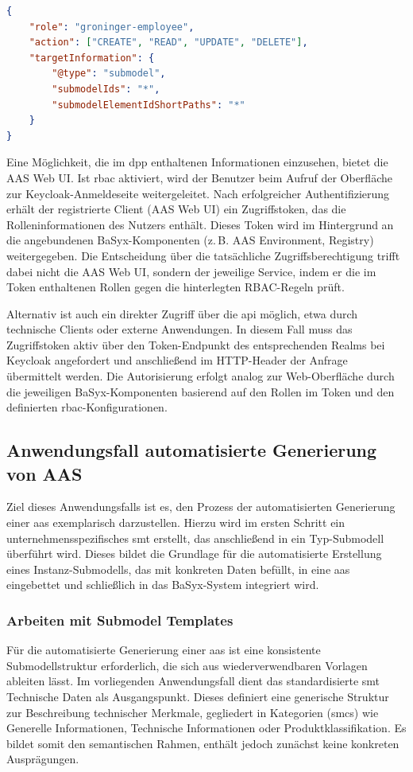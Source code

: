 \begin{lstlisting}[language=json, caption={RBAC-Konfiguration für die Rolle Groninger-Mitarbeiter}, label={lst:groningerMitarbeiterRBAC}]
{
    "role": "groninger-employee",
    "action": ["CREATE", "READ", "UPDATE", "DELETE"],
    "targetInformation": {
        "@type": "submodel",
        "submodelIds": "*",
        "submodelElementIdShortPaths": "*"
    }
}
\end{lstlisting}

Eine Möglichkeit, die im \acs{dpp} enthaltenen Informationen einzusehen, bietet die AAS Web UI. 
Ist \acs{rbac} aktiviert, wird der Benutzer beim Aufruf der Oberfläche zur Keycloak-Anmeldeseite weitergeleitet.  
Nach erfolgreicher Authentifizierung erhält der registrierte Client (AAS Web UI) ein Zugriffstoken, das die Rolleninformationen des Nutzers enthält.  
Dieses Token wird im Hintergrund an die angebundenen BaSyx-Komponenten (z.\,B. AAS Environment, Registry) weitergegeben.  
Die Entscheidung über die tatsächliche Zugriffsberechtigung trifft dabei nicht die AAS Web UI, sondern der jeweilige Service, indem er die im Token enthaltenen Rollen gegen die hinterlegten RBAC-Regeln prüft.

Alternativ ist auch ein direkter Zugriff über die \acs{api} möglich, etwa durch technische Clients oder externe Anwendungen.  
In diesem Fall muss das Zugriffstoken aktiv über den Token-Endpunkt des entsprechenden Realms bei Keycloak angefordert und anschließend im HTTP-Header der Anfrage übermittelt werden.  
Die Autorisierung erfolgt analog zur Web-Oberfläche durch die jeweiligen BaSyx-Komponenten basierend auf den Rollen im Token und den definierten \acs{rbac}-Konfigurationen.

\subsection{Anwendungsfall automatisierte Generierung von AAS}
Ziel dieses Anwendungsfalls ist es, den Prozess der automatisierten Generierung einer \acs{aas} exemplarisch darzustellen. 
Hierzu wird im ersten Schritt ein unternehmensspezifisches \acs{smt} erstellt, das anschließend in ein Typ-Submodell überführt wird.
Dieses bildet die Grundlage für die automatisierte Erstellung eines Instanz-Submodells, das mit konkreten Daten befüllt, in eine \acs{aas} eingebettet und schließlich in das BaSyx-System integriert wird.

\subsubsection{Arbeiten mit Submodel Templates}
\label{chap:ErstellenvonSubmodelTemplates}
Für die automatisierte Generierung einer \acs{aas} ist eine konsistente Submodellstruktur erforderlich, die sich aus wiederverwendbaren Vorlagen ableiten lässt.
Im vorliegenden Anwendungsfall dient das standardisierte \acs{smt} Technische Daten \cite{SpezifikaitonTechnischeDaten} als Ausgangspunkt. 
Dieses definiert eine generische Struktur zur Beschreibung technischer Merkmale, gegliedert in Kategorien (\acsp{smc}) wie Generelle Informationen, Technische Informationen oder Produktklassifikation. 
Es bildet somit den semantischen Rahmen, enthält jedoch zunächst keine konkreten Ausprägungen.

